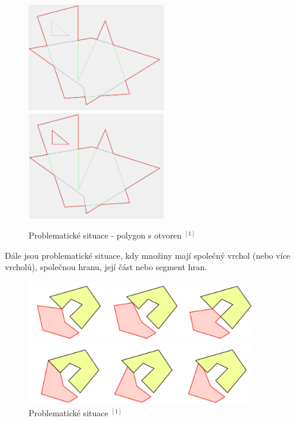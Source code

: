 \documentclass[a4paper, 12pt]{article}
\begin{document}
\begin{figure}[h]
	\centering
	\includegraphics[width=6cm]{emental_sptne.jpg}
	\includegraphics[width=6cm]{emental_spravne.jpg}
	\caption{Problematické situace - polygon s otvoren $^{[1]}$ }
\end{figure}



\noindent Dále jsou problematické situace, kdy množiny mají společný vrchol (nebo více vrcholů), společnou hranu, její část nebo segment hran.\\

\begin{figure}[h]
	\centering
	\includegraphics[width=10cm]{singularity.jpg}
	\caption{Problematické situace $^{[1]}$ }
\end{figure}
\end{document}
